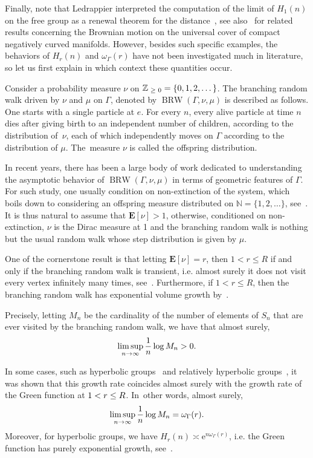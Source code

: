 \documentclass[10pt]{amsart}
\theoremstyle{definition}\newtheorem{defi}[theo]{Definition}\newtheorem{rema}[theo]{Remark}\newtheorem{exam}[theo]{Example}\newtheorem{exem}[theo]{Example}\newtheorem{nota}[theo]{Notation}
\newcommand{\N}{\mathbb{N}}
\newcommand{\Z}{\mathbb{Z}}
\newcommand{\rme}{\mathrm{e}}
\newcommand{\bfE}{\mathbf{E}}
\DeclareMathOperator{\BRW}{BRW}
\let\oldge\ge
\renewcommand{\ge}{\mathchoice{\oldge}{\oldge}{\,\oldge\,}{\,\oldge\,}}
\let\oldle\le
\renewcommand{\le}{\mathchoice{\oldle}{\oldle}{\,\oldle\,}{\,\oldle\,}}
\renewcommand*{\to}{\mathchoice{\longrightarrow}{\rightarrow}{\rightarrow}{\rightarrow}}
\begin{document}
Finally, note that Ledrappier interpreted the computation of the limit of $H_1(n)$ on the free group as a renewal theorem for the distance~\cite{Ledrappier01}, see also~\cite{Ledrappier93} for related results concerning the Brownian motion on the universal cover of compact negatively curved manifolds. However, besides such specific examples, the behaviors of $H_r(n)$ and $\omega_\Gamma(r)$ have not been investigated much in literature, so let us first explain in which context these quantities occur.



Consider a probability measure $\nu$ on $\Z_{\ge 0}=\{0,1,2,\dots\}$. The branching random walk driven by $\nu$ and $\mu$ on $\Gamma$, denoted by $\BRW(\Gamma,\nu,\mu)$ is described as follows. One starts with a single particle at $e$. For every $n$, every alive particle at time $n$ dies after giving birth to an independent number of children, according to the distribution of~$\nu$, each of which independently moves on $\Gamma$ according to the distribution of $\mu$. The~measure $\nu$ is called the offspring distribution.

In recent years, there has been a large body of work dedicated to understanding the asymptotic behavior of $\BRW(\Gamma,\nu,\mu)$ in terms of geometric features of $\Gamma$. For such study, one usually condition on non-extinction of the system, which boils down to considering an offspring measure distributed on $\N=\{1,2,\dots\}$, see~\cite[Chapter~1]{AN04}. It is thus natural to assume that $\bfE[\nu]>1$, otherwise, conditioned on non-extinction, $\nu$ is the Dirac measure at 1 and the branching random walk is nothing but the usual random walk whose step distribution is given by $\mu$.

One of the cornerstone result is that letting $\bfE[\nu]=r$, then $1<r\leq R$ if and only if the branching random walk is transient, i.e. almost surely it does not visit every vertex infinitely many times, see~\cite{BP94,GM06}. Furthermore, if $1<r\leq R$, then the branching random walk has exponential volume growth by~\cite{BM12}.

Precisely, letting $M_n$ be the cardinality of the number of elements of $S_n$ that are ever visited by the branching random walk, we have that almost surely,
\[
\limsup_{n\to\infty} \frac{1}{n}\log M_n>0.
\]


In some cases, such as hyperbolic groups~\cite[Theorem~1.1]{SWX} and relatively hyperbolic groups~\cite[Theorem~1.1]{DWY}, it was shown that this growth rate coincides almost surely with the growth rate of the Green function at $1<r\le R$. In~other words, almost surely,
\[
\limsup_{n\to\infty} \frac{1}{n}\log M_n=\omega_\Gamma(r).
\]
Moreover, for hyperbolic groups, we have $H_r(n)\asymp \rme^{n\omega_\Gamma(r)}$, i.e. the Green function has purely exponential growth, see~\cite[Theorem~3.1]{SWX}.
\end{document}
